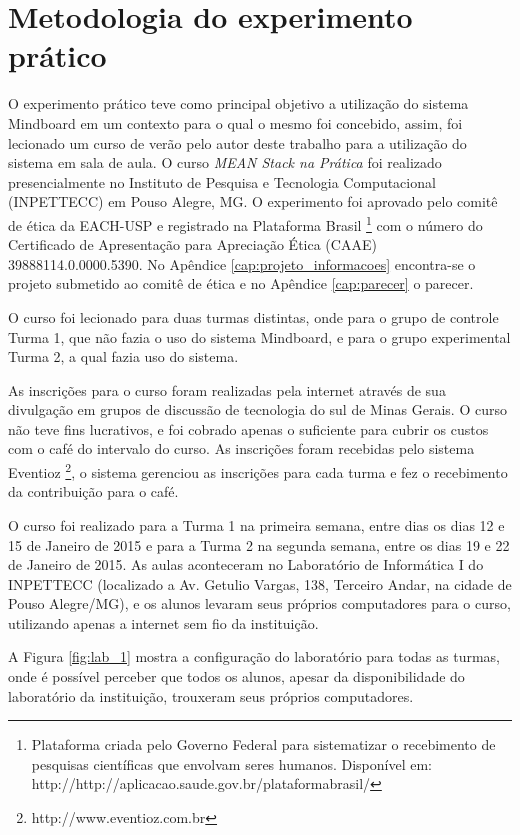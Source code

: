 \section{Metodologia do experimento prático}
\label{sec:metodologia_experimento}

O experimento prático teve como principal objetivo a utilização do sistema Mindboard em um contexto para o qual o mesmo foi concebido, assim, foi lecionado um curso de verão pelo autor deste trabalho para a utilização do sistema em sala de aula. O curso \emph{MEAN Stack na Prática} foi realizado presencialmente no Instituto de Pesquisa e Tecnologia Computacional (INPETTECC) em Pouso Alegre, MG. O experimento foi aprovado pelo comitê de ética da EACH-USP e registrado na Plataforma Brasil \footnote{Plataforma criada pelo Governo Federal para sistematizar o recebimento de pesquisas científicas que envolvam seres humanos. Disponível em: http://http://aplicacao.saude.gov.br/plataformabrasil/} com o número do Certificado de Apresentação para Apreciação Ética (CAAE) 39888114.0.0000.5390. No Apêndice \ref{cap:projeto_informacoes} encontra-se o projeto submetido ao comitê de ética e no Apêndice \ref{cap:parecer} o parecer.

O curso foi lecionado para duas turmas distintas, onde para o grupo de controle Turma 1, que não fazia o uso do sistema Mindboard, e para o grupo experimental Turma 2, a qual fazia uso do sistema.

As inscrições para o curso foram realizadas pela internet através de sua divulgação em grupos de discussão de tecnologia do sul de Minas Gerais. O curso não teve fins lucrativos, e foi cobrado apenas o suficiente para cubrir os custos com o café do intervalo do curso. As inscrições foram recebidas pelo sistema Eventioz \footnote{http://www.eventioz.com.br}, o sistema gerenciou as inscrições para cada turma e fez o recebimento da contribuição para o café.

O curso foi realizado para a Turma 1 na primeira semana, entre dias os dias 12 e 15 de Janeiro de 2015 e para a Turma 2 na segunda semana, entre os dias 19 e 22 de Janeiro de 2015.  As aulas aconteceram no Laboratório de Informática I do INPETTECC (localizado a Av. Getulio Vargas, 138, Terceiro Andar, na cidade de Pouso Alegre/MG), e os alunos levaram seus próprios computadores para o curso, utilizando apenas a internet sem fio da instituição.

A Figura \ref{fig:lab_1} mostra a configuração do laboratório para todas as turmas, onde é possível perceber que todos os alunos, apesar da disponibilidade do laboratório da instituição, trouxeram seus próprios computadores.

